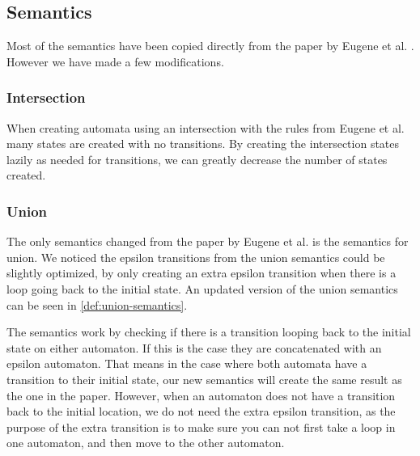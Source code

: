 \subsection{Semantics}\label{subsec:semantics}
\begin{comment}
    Where do most of our semantics come from?
    
    Intersection semantics
     - Motivation

    Describe union semantics
     - Motivation
     - New definition
     - Visual change
    
    Describe MatchAny semantics
     - Motivation
     - Definition
     - Visual
\end{comment}

Most of the semantics have been copied directly from the paper by Eugene et al. \cite{Eugene2001}. However we have made a few modifications.

\subsubsection{Intersection}
When creating automata using an intersection with the rules from Eugene et al.
many states are created with no transitions.
By creating the intersection states lazily as needed for transitions, we can greatly decrease the number of states created.

\subsubsection{Union}
The only semantics changed from the paper by Eugene et al. is the semantics for union. We noticed the epsilon transitions from the union semantics could be slightly optimized, by only creating an extra epsilon transition when there is a loop going back to the initial state. An updated version of the union semantics can be seen in \cref{def:union-semantics}.



The semantics work by checking if there is a transition looping back to the initial state on either automaton. If this is the case they are concatenated with an epsilon automaton. That means in the case where both automata have a transition to their initial state, our new semantics will create the same result as the one in the paper. However, when an automaton does not have a transition back to the initial location, we do not need the extra epsilon transition, as the purpose of the extra transition is to make sure you can not first take a loop in one automaton, and then move to the other automaton.

